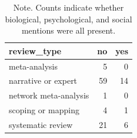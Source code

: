 \begin{table}[htbp]
\raggedright
\caption{Primary Research Question 2. Triadic BPS mention by review type.}
\label{tab.triadic.by.review.type}
\begin{tabular}{lrr}
\toprule
review\_type & no & yes \\
\midrule
meta-analysis & 5 & 0 \\
narrative or expert & 59 & 14 \\
network meta-analysis & 1 & 0 \\
scoping or mapping & 4 & 1 \\
systematic review & 21 & 6 \\
\bottomrule
\end{tabular}

\caption*{Note. Counts indicate whether biological, psychological, and social mentions were all present.}
\end{table}
